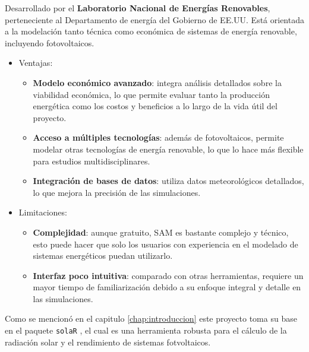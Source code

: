 \begin{enumerate}
Desarrollado por el \textbf{Laboratorio Nacional de Energías Renovables}, perteneciente al Departamento de energía del Gobierno de EE.UU. Está orientada a la modelación tanto técnica como económica de sistemas de energía renovable, incluyendo fotovoltaicos.
\begin{itemize}
\item Ventajas:
\begin{itemize}
\item \textbf{Modelo económico avanzado}: integra análisis detallados sobre la viabilidad económica, lo que permite evaluar tanto la producción energética como los costos y beneficios a lo largo de la vida útil del proyecto.
\item \textbf{Acceso a múltiples tecnologías}: además de fotovoltaicos, permite modelar otras tecnologías de energía renovable, lo que lo hace más flexible para estudios multidisciplinares.
\item \textbf{Integración de bases de datos}: utiliza datos meteorológicos detallados, lo que mejora la precisión de las simulaciones.
\end{itemize}
\item Limitaciones:
\begin{itemize}
\item \textbf{Complejidad}: aunque gratuito, SAM es bastante complejo y técnico, esto puede hacer que solo los usuarios con experiencia en el modelado de sistemas energéticos puedan utilizarlo.
\item \textbf{Interfaz poco intuitiva}: comparado con otras herramientas, requiere un mayor tiempo de familiarización debido a su enfoque integral y detalle en las simulaciones.
\end{itemize}
\end{itemize}
\end{enumerate}

Como se mencionó en el capitulo \ref{chap:introduccion} este proyecto toma su base en el paquete \texttt{solaR} \cite{perpinan12}, el cual es una herramienta robusta para el cálculo de la radiación solar y el rendimiento de sistemas fotvoltaicos.

